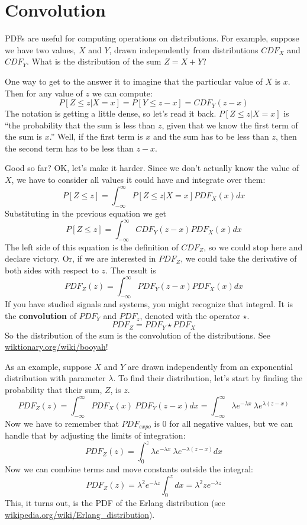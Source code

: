 \documentclass[12pt]{book}
\begin{document}
\section{Convolution}

PDFs are useful for computing operations on distributions.  For
example, suppose we have two values, $X$ and $Y$, drawn independently
from distributions $CDF_X$ and $CDF_Y$.  What is the distribution of
the sum $Z = X + Y$?


One way to get to the answer it to imagine that the particular value
of $X$ is $x$.  Then for any value of $z$ we can compute:
%
\[ P[Z \le z | X = x] = P[Y \le z-x] = CDF_Y(z-x) \]
%
The notation is getting a little dense, so let's read it back.  
$P[Z \le z | X = x]$ is ``the probability that the sum is less than
$z$, given that we know the first term of the sum is $x$.''  Well, if
the first term is $x$ and the sum has to be less than $z$, then the
second term has to be less than $z-x$.

\newcommand{\infint}{\int_{-\infty}^{\infty}}
\newcommand{\convolution}{\star}

Good so far?  OK, let's make it harder.  Since we don't actually know
the value of $X$, we have to consider all values it could have and
integrate over them:
%
\[ P[Z \le z] = \infint P[Z \le z | X = x] PDF_X(x) dx \]
%
Substituting in the previous equation we get
%
\[ P[Z \le z] = \infint CDF_Y(z-x) PDF_X(x) dx \]
%
The left side of this equation is the definition of
$CDF_Z$, so we could stop here and declare victory.  Or, if
we are interested in $PDF_Z$, we could take the derivative of
both sides with respect to $z$.  The result is
%
\[ PDF_Z(z) = \infint PDF_Y(z-x) PDF_X(x) dx  \]
%
If you have studied signals and systems, you might recognize that
integral.  It is the {\bf convolution} of $PDF_Y$ and $PDF_z$, denoted
with the operator $\convolution$.
%
\[ PDF_Z = PDF_Y \convolution PDF_X \]
%
So the distribution of the sum is the convolution of the distributions.
See \url{wiktionary.org/wiki/booyah}!



As an example, suppose $X$ and $Y$ are drawn independently from an
exponential distribution with parameter $\lambda$.  To find their
distribution, let's start by finding the probability that their
sum, $Z$, is $z$.
%
\[ PDF_Z(z) = \infint PDF_X(x)~PDF_Y(z-x) dx = 
\infint \lambda e^{-\lambda x}~\lambda e^{\lambda (z-x)} \]
%
Now we have to remember that $PDF_{expo}$ is 0 for all negative
values, but we can handle that by adjusting the limits of integration:
%
\[ PDF_Z(z) = \int_{0}^{z} \lambda e^{-\lambda x}~\lambda e^{-\lambda (z-x)} dx \]
%
Now we can combine terms and move constants outside the integral:
%
\[ PDF_Z(z) = \lambda^2 e^{-\lambda z} \int_{0}^{z} dx = 
\lambda^2 z e^{-\lambda z} \]
%
This, it turns out, is the PDF of the Erlang distribution (see
\url{wikipedia.org/wiki/Erlang_distribution}).
\end{document}
